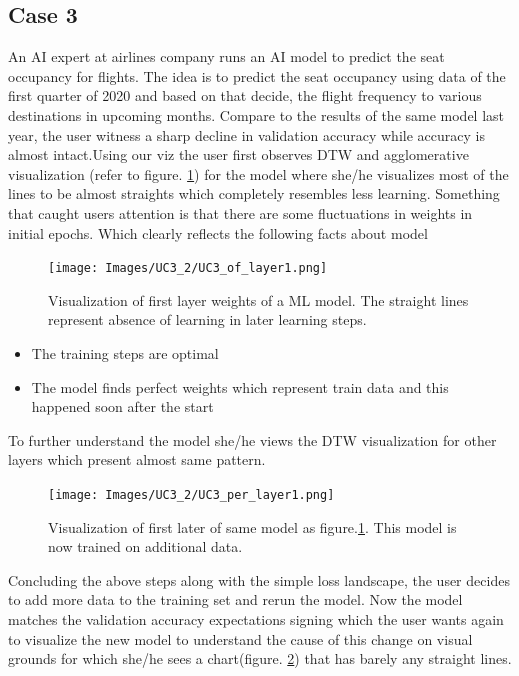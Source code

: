 \documentclass[journal]{vgtc}                %
\begin{document}
\subsection{Case 3}An AI expert at airlines company runs an AI model to predict the seat occupancy for flights. The idea is to predict the seat occupancy using data of the first quarter of 2020 and based on that decide, the flight frequency to various destinations in upcoming months.
Compare to the results of the same model last year, the user witness a sharp decline in validation accuracy while accuracy is almost intact.Using our viz the user first observes DTW and agglomerative visualization  (refer to figure. \ref{case3_dtw_of}) for the model where she/he visualizes most of the lines to be almost straights which completely resembles less learning. Something that caught users attention is that there are some fluctuations in weights in initial epochs.
Which clearly reflects the following facts about model
\begin{figure}
    \texttt{[image: Images/UC3\_2/UC3\_of\_layer1.png]}
    \caption{Visualization of first layer weights of a ML model. The straight lines represent absence of learning in later learning steps.}
    \label{case3_dtw_of}
\end{figure}

\begin{itemize}
\item The training steps are optimal 
\item The model finds perfect weights which represent train data and this happened soon after the start
\end{itemize}
To further understand the model she/he views the DTW visualization for other layers which present almost same pattern.


\begin{figure}
    \texttt{[image: Images/UC3\_2/UC3\_per\_layer1.png]}
    \caption{Visualization of first later of same model as figure.\ref{case3_dtw_of}. This model is now trained on additional data. }
    \label{case3_dtw_layer0_fit}
\end{figure}


Concluding the above steps along with the simple loss landscape, the user decides to add more data to the training set and rerun the model. Now the model matches the validation accuracy expectations signing which the user wants again to visualize the new model to understand the cause of this change on visual grounds for which she/he sees a chart(figure. \ref{case3_dtw_layer0_fit}) that has barely any straight lines.
\end{document}
